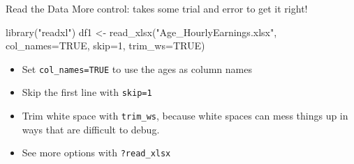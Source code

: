\documentclass[
  11pt,
  ignorenonframetext,
  svgnames, handout, t]{beamer}
\newenvironment{Shaded}{\begin{snugshade}}{\end{snugshade}}
\newcommand{\AttributeTok}[1]{\textcolor[rgb]{0.77,0.63,0.00}{#1}}
\newcommand{\ConstantTok}[1]{\textcolor[rgb]{0.00,0.00,0.00}{#1}}
\newcommand{\DecValTok}[1]{\textcolor[rgb]{0.00,0.00,0.81}{#1}}
\newcommand{\FunctionTok}[1]{\textcolor[rgb]{0.00,0.00,0.00}{#1}}
\newcommand{\NormalTok}[1]{#1}
\newcommand{\OtherTok}[1]{\textcolor[rgb]{0.56,0.35,0.01}{#1}}
\newcommand{\StringTok}[1]{\textcolor[rgb]{0.31,0.60,0.02}{#1}}
\begin{document}
\begin{frame}[fragile]{Read the Data}
\protect\hypertarget{read-the-data-1}{}
More control: takes some trial and error to get it right!

\footnotesize

\begin{Shaded}
\begin{Highlighting}[]
\FunctionTok{library}\NormalTok{(}\StringTok{"readxl"}\NormalTok{)}
\NormalTok{df1 }\OtherTok{\textless{}{-}} \FunctionTok{read\_xlsx}\NormalTok{(}\StringTok{"Age\_HourlyEarnings.xlsx"}\NormalTok{,}
                  \AttributeTok{col\_names=}\ConstantTok{TRUE}\NormalTok{,}
                  \AttributeTok{skip=}\DecValTok{1}\NormalTok{,}
                  \AttributeTok{trim\_ws=}\ConstantTok{TRUE}\NormalTok{)}
\end{Highlighting}
\end{Shaded}

\normalsize

\begin{itemize}
\item
  Set \texttt{col\_names=TRUE} to use the ages as column names
\item
  Skip the first line with \texttt{skip=1}
\item
  Trim white space with \texttt{trim\_ws}, because white spaces can mess
  things up in ways that are difficult to debug.
\item
  See more options with \texttt{?read\_xlsx}
\end{itemize}
\end{frame}
\end{document}
